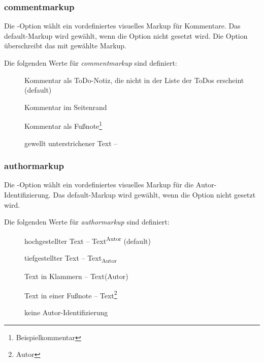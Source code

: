 

\subsubsection{commentmarkup}


Die -Option wählt ein vordefiniertes visuelles Markup für Kommentare.
Das default-Markup wird gewählt, wenn die Option nicht gesetzt wird.
Die Option  überschreibt das mit  gewählte Markup.

Die folgenden Werte für \emph{commentmarkup} sind definiert:

\begin{description}
	\item [] Kommentar als ToDo-Notiz, die nicht in der Liste der ToDos erscheint (default)
	\item [] Kommentar im Seitenrand
	\item [] Kommentar als Fußnote\footnote{Beispielkommentar}
	\item [] gewellt unterstrichener Text -- 
\end{description}



\subsubsection{authormarkup}


Die -Option wählt ein vordefiniertes visuelles Markup für die Autor-Identifizierung.
Das default-Markup wird gewählt, wenn die Option nicht gesetzt wird.

Die folgenden Werte für \emph{authormarkup} sind definiert:

\begin{description}
	\item [] hochgestellter Text -- Text\textsuperscript{Autor} (default)
	\item [] tiefgestellter Text -- Text\textsubscript{Autor}
	\item [] Text in Klammern -- Text(Autor)
	\item [] Text in einer Fußnote -- Text\footnote{Autor}
	\item [] keine Autor-Identifizierung
\end{description}

